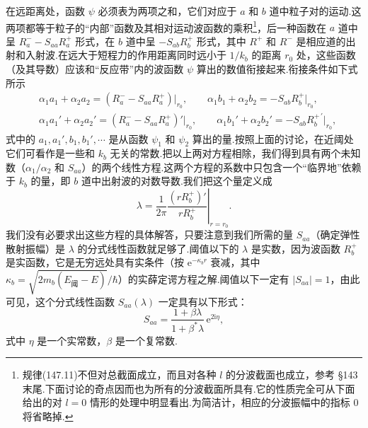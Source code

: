 在远距离处，函数 $\psi$ 必须表为两项之和，它们对应于 $a$ 和 $b$ 道中粒子对的运动.这两项都等于粒子的“内部”函数及其相对运动波函数的乘积\footnote{规律(147.11)不但对总截面成立，而且对各种 $l$ 的分波截面也成立，参考 §143 末尾.下面讨论的奇点因而也为所有的分波截面所具有.它的性质完全可从下面给出的对 $l=0$ 情形的处理中明显看出.为简洁计，相应的分波振幅中的指标 0 将省略掉.}，后一种函数在 $a$ 道中呈 $R_a^{-}-S_{aa}R_a^{+}$ 形式，在 $b$ 道中呈 $-S_{ab}R_b^{+}$ 形式，其中 $R^{+}$ 和 $R^{-}$ 是相应道的出射和入射波.在远大于短程力的作用距离同时远小于 $1/k_b$ 的距离 $r_0$ 处，这些函数（及其导数）应该和“反应带”内的波函数 $\psi$ 算出的数值衔接起来.衔接条件如下式所示
\begin{equation*}
\begin{aligned}
  &\alpha_1a_1+\alpha_2a_2=\left(R_a^{-}-S_{aa}R_a^{+}\right)\bigr|_{r_0},\qquad
  \alpha_1b_1+\alpha_2b_2=-S_{ab}R_b^{+}\bigr|_{r_0},\\
  &\alpha_1a_1'+\alpha_2a_2'=\left(R_a^{-}-S_{aa}R_a^{+}\right)'\bigr|_{r_0},\qquad
  \alpha_1b_1'+\alpha_2b_2'=-S_{ab}R_b^{+\,\prime}\bigr|_{r_0},
\end{aligned}
\end{equation*}
式中的 $a_1,a_1',b_1,b_1',\cdots$ 是从函数 $\psi_1$ 和 $\psi_2$ 算出的量.按照上面的讨论，在近阈处它们可看作是一些和 $k_b$ 无关的常数.把以上两对方程相除，我们得到具有两个未知数（$\alpha_1/\alpha_2$ 和 $S_{aa}$）的两个线性方程.这两个方程的系数中只包含一个“临界地”依赖于 $k_b$ 的量，即 $b$ 道中出射波的对数导数.我们把这个量定义成
\begin{equation*}
  \lambda=\frac{1}{2\pi}\left.\frac{(rR_b^{+})'}{rR_b^{+}}\right|_{r=r_0}.
\end{equation*}
我们没有必要求出这些方程的具体解答，只要注意到我们所需的量 $S_{aa}$（确定弹性散射振幅）是 $\lambda$ 的分式线性函数就足够了.阈值以下的 $\lambda$ 是实数，因为波函数 $R_b^{+}$ 是实函数，它是无穷远处具有实条件（按 $\mathrm{e}^{-\kappa_br}$ 衰减，其中 $\kappa_b=\sqrt{2m_b\left(E_{\text{阈}}-E\right)}/\hbar$）的实薛定谔方程之解.阈值以下一定有 $|S_{aa}|=1$，由此可见，这个分式线性函数 $S_{aa}(\lambda)$ 一定具有以下形式：
\begin{equation}
  S_{aa}=\frac{1+\beta\lambda}{1+\beta^{*}\lambda}\,\mathrm{e}^{2\mathrm{i}\eta},
\end{equation}
式中 $\eta$ 是一个实常数，$\beta$ 是一个复常数.

